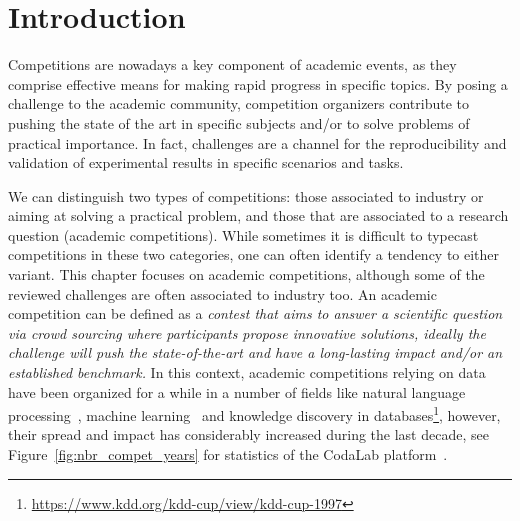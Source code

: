 \documentclass[twoside,11pt]{article}
\begin{document}
\section{Introduction}
\label{sec:intro}
Competitions are nowadays a key component of academic events, as they comprise effective means for making rapid progress in specific topics. By posing a challenge to the academic community, competition organizers contribute to pushing the state of the art in specific subjects and/or to solve problems of practical importance. In fact, challenges are a channel for the reproducibility and validation of experimental results in specific scenarios and tasks.

We can distinguish two types of competitions: those associated to industry or aiming at solving a practical problem, and those that are associated to a research question (academic competitions). While sometimes it is  difficult to typecast competitions in these two categories, one can often identify a tendency to either variant. This chapter focuses on academic competitions, although some of the reviewed challenges are often associated to industry too. 
An academic competition can be defined as a \emph{contest that  aims to answer a scientific question via crowd sourcing where participants propose innovative solutions, ideally the challenge will  push the state-of-the-art and have a long-lasting impact and/or an established benchmark.} In this context, academic competitions relying on data have been organized for a while in a number of fields like  natural language processing~\citep{trec93}, machine learning~\citep{NIPS2004_5e751896} and  knowledge discovery in databases\footnote{\url{https://www.kdd.org/kdd-cup/view/kdd-cup-1997}}, however, their spread and impact has %
considerably increased during the last decade, see Figure~\ref{fig:nbr_compet_years} for statistics of the CodaLab platform~\citep{codalab_competitions_JMLR}. 
\end{document}
